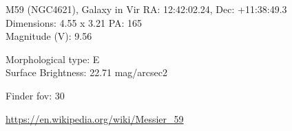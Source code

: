 \begin{block}{M59 (NGC4621), Galaxy in Vir}
    RA: 12:42:02.24, Dec: +11:38:49.3 \\ 
    Dimensions: 4.55 x 3.21 PA: 165 \\ 
    Magnitude (V): 9.56

    Morphological type: E \\ 
    Surface Brightness: 22.71 mag/arcsec2 


    Finder fov: 30 

    \url{https://en.wikipedia.org/wiki/Messier_59} 
\end{block}